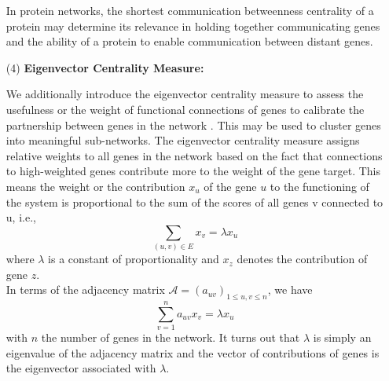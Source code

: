 \documentclass[10pt]{article}
\begin{document}
\begin{itemize}
In protein networks, the shortest communication betweenness centrality of a protein may determine its relevance in holding together communicating genes and the ability of a protein to enable communication between distant genes.

\item [(4)] \textbf{Eigenvector Centrality Measure:}

We additionally introduce the eigenvector centrality measure to assess the usefulness or the weight of functional connections of genes to calibrate the partnership between genes in the network \cite{wu,cowy}. This may be used to cluster genes into meaningful sub-networks. The eigenvector centrality measure assigns relative weights to all genes in the network based on the fact that connections to high-weighted genes contribute more to the weight of the gene target. This means the weight or the contribution $x_{u}$ of the gene $u$ to the functioning of the system is proportional to the sum of the scores of all genes v connected to u, i.e.,
\begin{equation*}
    \sum_{(u,v) \in E} x_{v} = \lambda x_{u} \nonumber
\end{equation*}
where $\lambda$ is a constant of proportionality and $x_{z}$ denotes the contribution of gene $z$.\\
In terms of the adjacency matrix $\mathcal{A} = \left(a_{uv}\right)_{1\leq u,v \leq n}$, we have
\begin{equation*}
    \sum_{v = 1}^n a_{uv} x_{v} = \lambda x_{u}
\end{equation*}
with $n$ the number of genes in the network. It turns out that $\lambda$ is simply an eigenvalue of the adjacency matrix and the vector of contributions of genes is the eigenvector associated with $\lambda$.

\end{itemize}
\end{document}
